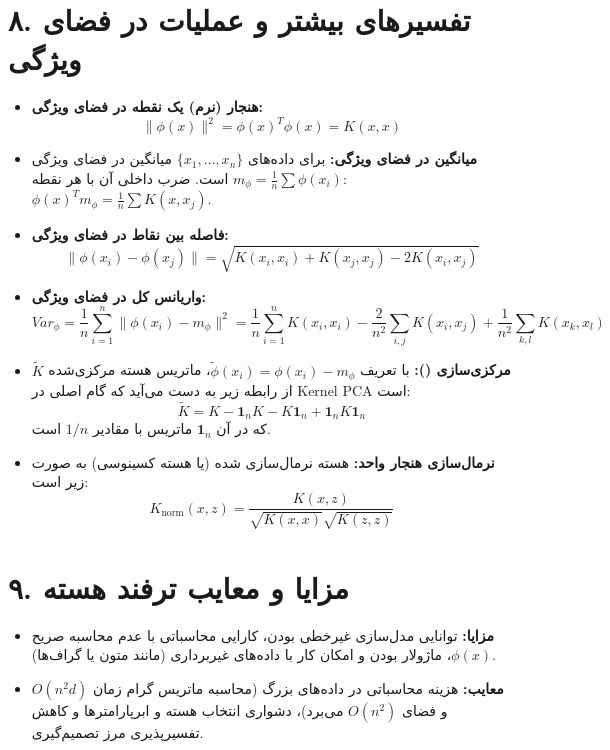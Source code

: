 \documentclass{article}
\begin{document}
\section*{۸. تفسیرهای بیشتر و عملیات در فضای ویژگی}
\begin{itemize}
    \item \textbf{هنجار (نرم) یک نقطه در فضای ویژگی:} 
    \[
    \|\phi(x)\|^2 = \phi(x)^T \phi(x) = K(x, x)
    \]
    \item \textbf{میانگین در فضای ویژگی:} برای داده‌های $\{x_1, \dots, x_n\}$ میانگین در فضای ویژگی $m_{\phi} = \frac{1}{n} \sum \phi(x_i)$ است. ضرب داخلی آن با هر نقطه: $\phi(x)^T m_{\phi} = \frac{1}{n} \sum K(x, x_j)$.
    \item \textbf{فاصله بین نقاط در فضای ویژگی:} 
    \[
    \|\phi(x_i) - \phi(x_j)\| = \sqrt{K(x_i, x_i) + K(x_j, x_j) - 2 K(x_i, x_j)}
    \]
    \item \textbf{واریانس کل در فضای ویژگی:}
    \[
    Var_{\phi} = \frac{1}{n} \sum_{i=1}^n \|\phi(x_i) - m_{\phi}\|^2 = \frac{1}{n} \sum_{i=1}^n K(x_i, x_i) - \frac{2}{n^2} \sum_{i,j} K(x_i, x_j) + \frac{1}{n^2} \sum_{k,l} K(x_k, x_l)
    \]
    \item \textbf{مرکزی‌سازی ():} با تعریف $\tilde{\phi}(x_i) = \phi(x_i) - m_{\phi}$، ماتریس هسته مرکزی‌شده $\tilde{K}$ از رابطه زیر به دست می‌آید که گام اصلی در Kernel PCA است:
    \[
    \tilde{K} = K - \mathbf{1}_n K - K \mathbf{1}_n + \mathbf{1}_n K \mathbf{1}_n
    \]
    که در آن $\mathbf{1}_n$ ماتریس با مقادیر $1/n$ است.
    \item \textbf{نرمال‌سازی هنجار واحد:} هسته نرمال‌سازی شده (یا هسته کسینوسی) به صورت زیر است:
    \[
    K_{\text{norm}}(x, z) = \frac{K(x, z)}{\sqrt{K(x, x)} \sqrt{K(z, z)}}
    \]
\end{itemize}

\section*{۹. مزایا و معایب ترفند هسته}
\begin{itemize}
    \item \textbf{مزایا:} توانایی مدل‌سازی غیرخطی بودن، کارایی محاسباتی با عدم محاسبه صریح $\phi(x)$، ماژولار بودن و امکان کار با داده‌های غیربرداری (مانند متون یا گراف‌ها).
    \item \textbf{معایب:} هزینه محاسباتی در داده‌های بزرگ (محاسبه ماتریس گرام زمان $O(n^2 d)$ و فضای $O(n^2)$ می‌برد)، دشواری انتخاب هسته و ابرپارامترها و کاهش تفسیرپذیری مرز تصمیم‌گیری.
\end{itemize}
\end{document}
